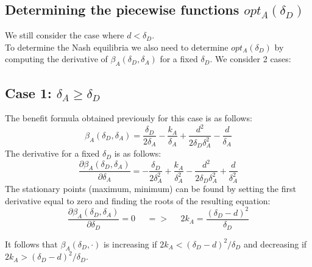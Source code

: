 %
%
\subsection{Determining the piecewise functions $opt_{A}(\delta_{D})$}
We still consider the case where $d < \delta_{D}$. \\
To determine the Nash equilibria we also need to determine $opt_{A}(\delta_{D})$ by computing the derivative of $\beta_{A}(\delta_{D},\delta_{A})$ for a fixed $\delta_{D}$. We consider 2 cases: \\

\subsection*{Case 1: $\delta_{A} \geq \delta_{D}$}

The benefit formula obtained previously for this case is as follows:
\begin{equation*}
\beta_{A}(\delta_{D},\delta_{A}) =\dfrac{\delta_{D}}{2\delta_{A}} - \dfrac{k_{A}}{\delta_{A}} + \dfrac{d^{2}}{2\delta_{D}\delta_{A}^{2}} - \dfrac{d}{\delta_{A}}
\end{equation*}
The derivative for a fixed $\delta_{D}$ is as follows:
\begin{equation*}
\dfrac{\partial \beta_{A}(\delta_{D},\delta_{A})}{\partial \delta_{A}} = -\dfrac{\delta_{D}}{2\delta_{A}^{2}} + \dfrac{k_{A}}{\delta_{A}^{2}} - \dfrac{d^{2}}{2\delta_{D}\delta_{A}^{2}} + \dfrac{d}{\delta_{A}^{2}}
\end{equation*}
The stationary points (maximum, minimum) can be found by setting the first derivative equal to zero and finding the roots of the resulting equation:
\begin{equation*}
\frac{\partial \beta_{A}(\delta_{D},\delta_{A})}{\partial \delta_{D}} =0 ~~~~~~ =>~~~~~~ 2k_{A} = \dfrac{(\delta_{D}-d)^{2}}{\delta_{D}}
\end{equation*}

It follows that $\beta_{A}(\delta_{D},\cdot)$ is increasing if $2k_{A} < (\delta_{D} - d)^{2} / \delta_{D}$ and decreasing if $2k_{A} > (\delta_{D} - d)^{2} / \delta_{D}$. \\

